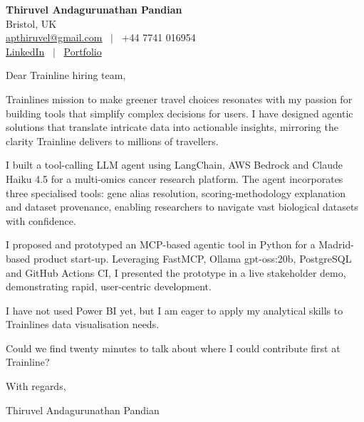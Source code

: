 \documentclass[11pt,a4paper]{article}
\begin{document}
\raggedright
\pagestyle{empty}

\begin{center}
    {\LARGE \color{linkblue} \textbf{Thiruvel Andagurunathan Pandian}}\\[0.2cm]
    Bristol, UK \\
    \href{mailto:apthiruvel@gmail.com}{apthiruvel@gmail.com} \ $|$ \ +44 7741 016954 \\
\href{https://www.linkedin.com/in/thiruvel-a-p/}{LinkedIn} \ $|$ \ \href{https://thiruvel-ap.github.io/PersonalPortfolio/}{Portfolio}
\end{center}

\vspace{0.4cm}

\noindent
Dear Trainline hiring team,

Trainline\textquotesingle{}s mission to make greener travel choices resonates with my passion for building tools that simplify complex decisions for users. I have designed agentic solutions that translate intricate data into actionable insights, mirroring the clarity Trainline delivers to millions of travellers.

I built a tool-calling LLM agent using LangChain, AWS Bedrock and Claude Haiku 4.5 for a multi-omics cancer research platform. The agent incorporates three specialised tools: gene alias resolution, scoring-methodology explanation and dataset provenance, enabling researchers to navigate vast biological datasets with confidence.

I proposed and prototyped an MCP-based agentic tool in Python for a Madrid-based product start-up. Leveraging FastMCP, Ollama gpt-oss:20b, PostgreSQL and GitHub Actions CI, I presented the prototype in a live stakeholder demo, demonstrating rapid, user-centric development.

I have not used Power BI yet, but I am eager to apply my analytical skills to Trainline\textquotesingle{}s data visualisation needs.

Could we find twenty minutes to talk about where I could contribute first at Trainline?

\vspace{0.5cm}

With regards,

Thiruvel Andagurunathan Pandian
\end{document}
